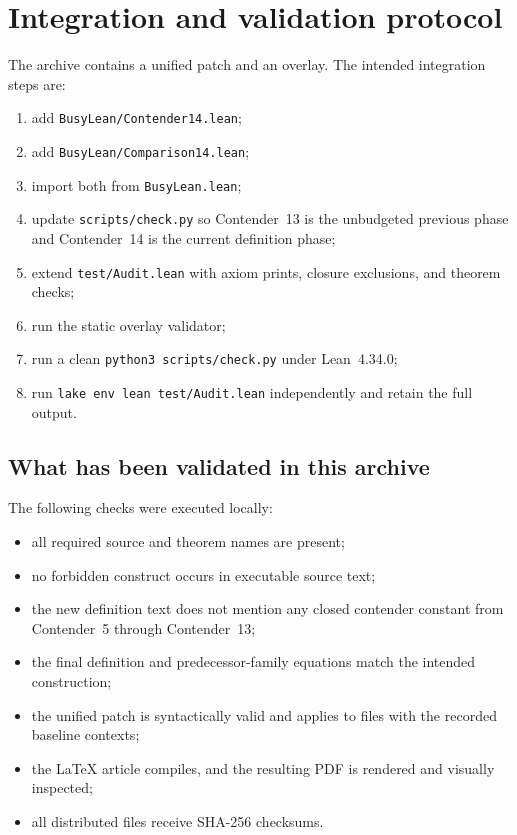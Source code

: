 \documentclass[11pt]{article}
\theoremstyle{definition}
\theoremstyle{remark}
\newcommand{\lean}[1]{\texttt{#1}}
\begin{document}
\section{Integration and validation protocol}

The archive contains a unified patch and an overlay.  The intended integration
steps are:

\begin{enumerate}[leftmargin=*]
\item add \lean{BusyLean/Contender14.lean};
\item add \lean{BusyLean/Comparison14.lean};
\item import both from \lean{BusyLean.lean};
\item update \lean{scripts/check.py} so Contender~13 is the unbudgeted previous
  phase and Contender~14 is the current definition phase;
\item extend \lean{test/Audit.lean} with axiom prints, closure exclusions, and
  theorem checks;
\item run the static overlay validator;
\item run a clean \lean{python3 scripts/check.py} under Lean~4.34.0;
\item run \lean{lake env lean test/Audit.lean} independently and retain the
  full output.
\end{enumerate}

\subsection{What has been validated in this archive}

The following checks were executed locally:

\begin{itemize}[leftmargin=*]
\item all required source and theorem names are present;
\item no forbidden construct occurs in executable source text;
\item the new definition text does not mention any closed contender constant
  from Contender~5 through Contender~13;
\item the final definition and predecessor-family equations match the intended
  construction;
\item the unified patch is syntactically valid and applies to files with the
  recorded baseline contexts;
\item the LaTeX article compiles, and the resulting PDF is rendered and
  visually inspected;
\item all distributed files receive SHA-256 checksums.
\end{itemize}
\end{document}
